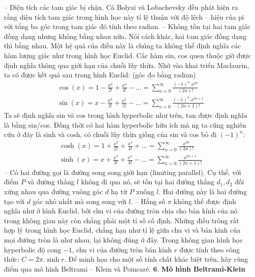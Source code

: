 \begin{multicols}{2}
	\vskip 0.1cm
	-- Diện tích các tam giác bị chặn. Cả Bolyai và Lobachevsky đều phát hiện ra rằng diện tích tam giác trong hình học này tỉ lệ thuận với độ lệch -- hiệu của pi với tổng ba góc trong tam giác đó tính theo radian.
	\vskip 0.1cm
	-- Không tồn tại hai tam giác đồng dạng nhưng không bằng nhau nữa. Nói cách khác, hai tam giác đồng dạng thì bằng nhau. 
	\vskip 0.1cm
	Một hệ quả của điều này là chúng ta không thể định nghĩa các hàm lượng giác như trong hình học Euclid. Các hàm sin, cos quen thuộc giờ được định nghĩa thông qua giới hạn của chuỗi lũy thừa. Nhờ vào khai triển Maclaurin, ta có được kết quả sau trong hình Euclid: (góc đo bằng radian)
	\begin{align*}
		&\cos(x) =  1 - \frac{x^2}{2!} + \frac{x^4}{4!} - ... = \sum_{n=0}^{\infty} \frac{(-1)^n.x^{2n}}{(2n)!} \\
		&\sin(x) =  x - \frac{x^3}{3!} + \frac{x^5}{5!} - ... = \sum_{n=0}^{\infty} \frac{(-1)^n.x^{2n+1}}{(2n+1)!}
	\end{align*}
	Ta sẽ định nghĩa sin và cos trong hình hyperbolic như trên, tan được định nghĩa là bằng sin/cos.
	Đồng thời có hai hàm hyperbolic hữu ích mà ng ta cũng nghiên cứu ở đây là sinh và cosh, có chuỗi lũy thừa giống của sin và cos bỏ đi $(-1)^n$:
	\begin{align*}
		&\cosh(x) =  1 + \frac{x^2}{2!} + \frac{x^4}{4!} + ... = \sum_{n=0}^{\infty} \frac{x^{2n}}{(2n)!} \\
		&\sinh(x) =  x + \frac{x^3}{3!} + \frac{x^4}{4!} - ... = \sum_{n=0}^{\infty} \frac{x^{2n+1}}{(2n+1)!}
	\end{align*}
	-- Có hai đường gọi là đường song song giới hạn (limiting parallel). Cụ thể, với điểm $P$ và đường thẳng $l$ không đi qua nó, sẽ tồn tại hai đường thẳng $d_1, d_2$ đối xứng nhau qua đường vuông góc $d$ hạ từ $P$ xuống $l$. Hai đường này là hai đường tạo với $d$ góc nhỏ nhất mà song song với $l$. 
	\vskip 0.1cm
	-- Hằng số $\pi$  không thể được định nghĩa như ở hình Euclid, bởi chu vi của đường tròn chia cho bán kính của nó trong không gian này còn chẳng phải một tỉ số cố định. Những điều trông rất hợp lý trong hình học Euclid, chẳng hạn như tỉ lệ giữa chu vi và bán kính của mọi đường tròn là như nhau, lại không đúng ở đây. Trong không gian hình học hyperbolic độ cong $-1$, chu vi của đường tròn bán kính $r$ được tính theo công thức: $C = 2\pi.\sinh r$. 
	\vskip 0.1cm
	Để minh họa cho một số tính chất khác biệt trên, hãy cùng điểm qua mô hình Beltrami -- Klein và Poincaré.  
	\vskip 0.1cm
	$\pmb{6. }$ \textbf{\color{lichsutoanhoc}Mô hình Beltrami-Klein}
	\vskip 0.1cm

\end{multicols}
